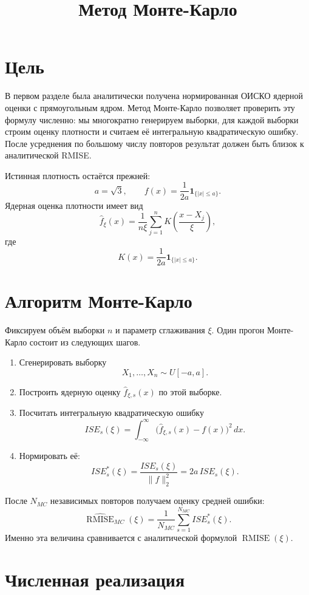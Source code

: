 \documentclass[12pt,a4paper]{article}
\begin{document}
\title{Метод Монте-Карло}
\author{}
\date{}
\maketitle

\section*{Цель}

В первом разделе была аналитически получена нормированная ОИСКО ядерной
оценки с прямоугольным ядром. Метод Монте-Карло позволяет проверить эту
формулу численно: мы многократно генерируем выборки, для каждой выборки
строим оценку плотности и считаем её интегральную квадратическую ошибку.
После усреднения по большому числу повторов результат должен быть близок к
аналитической RMISE.

Истинная плотность остаётся прежней:
\[
a=\sqrt{3},\qquad
f(x)=\frac{1}{2a}\mathbf 1_{\{|x|\le a\}}.
\]
Ядерная оценка плотности имеет вид
\[
\widehat f_{\xi}(x)
=
\frac{1}{n\xi}\sum_{j=1}^n
K\left(\frac{x-X_j}{\xi}\right),
\]
где
\[
K(x)=\frac{1}{2a}\mathbf 1_{\{|x|\le a\}}.
\]

\section*{Алгоритм Монте-Карло}

Фиксируем объём выборки $n$ и параметр сглаживания $\xi$. Один прогон
Монте-Карло состоит из следующих шагов.

\begin{enumerate}
\item Сгенерировать выборку
\[
X_1,\ldots,X_n\sim U[-a,a].
\]
\item Построить ядерную оценку $\widehat f_{\xi,s}(x)$ по этой выборке.
\item Посчитать интегральную квадратическую ошибку
\[
ISE_s(\xi)
=
\int_{-\infty}^{\infty}
\bigl(\widehat f_{\xi,s}(x)-f(x)\bigr)^2\,dx.
\]
\item Нормировать её:
\[
ISE_s^*(\xi)
=
\frac{ISE_s(\xi)}{\|f\|_2^2}
=
2a\,ISE_s(\xi).
\]
\end{enumerate}

После $N_{MC}$ независимых повторов получаем оценку средней ошибки:
\[
\widehat{\operatorname{RMISE}}_{MC}(\xi)
=
\frac{1}{N_{MC}}\sum_{s=1}^{N_{MC}} ISE_s^*(\xi).
\]
Именно эта величина сравнивается с аналитической формулой
$\operatorname{RMISE}(\xi)$.

\section*{Численная реализация}
\end{document}
